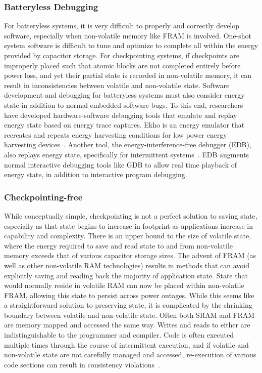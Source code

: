 \subsubsection{Batteryless Debugging}
For batteryless systems, it
is very difficult to properly and correctly develop software, especially when non-volatile memory like FRAM is involved.
One-shot system software is difficult to tune and optimize to complete all within the energy provided by capacitor storage.
For checkpointing systems, if checkpoints are improperly placed such that atomic blocks are not completed entirely before power loss, and yet their partial state is recorded in non-volatile memory,
it can result in inconsistencies between volatile and non-volatile state.
Software development and debugging for batteryless systems must also consider energy state in addition to normal embedded software bugs.
To this end, researchers have developed hardware-software debugging tools that emulate and replay energy state based on energy trace captures.
Ekho is an energy emulator that recreates and repeats energy harvesting conditions for low power energy harvesting devices~\cite{hester2014ekho}.
Another tool, the energy-interference-free debugger (EDB), also replays energy state, specifically for intermittent systems~\cite{colin2016energy}.
EDB augments normal interactive debugging tools like GDB to allow real time playback of energy state, in addition to interactive program debugging.

\subsubsection{Checkpointing-free}
While conceptually simple, checkpointing is not a perfect solution to saving state, especially as that state begins to increase in footprint as applications increase in capability and complexity. There is an upper bound to the size of volatile state, where the energy required to save and read state to and from non-volatile memory exceeds that of various capacitor storage sizes.
The advent of FRAM (as well as other non-volatile RAM technologies) results in methods that can avoid explicitly saving and reading back the majority of application state. State that would normally reside in volatile RAM can now be placed within non-volatile FRAM, allowing this state to persist across power outages.
While this seems like a straightforward solution to preserving state, it is complicated by the shrinking
boundary between volatile and non-volatile state. Often both SRAM and FRAM are memory mapped and accessed the same way. Writes and reads to either are indistinguishable to the programmer and compiler.
Code is often executed multiple times through the course of intermittent execution, and if volatile and non-volatile state are not carefully managed and accessed, re-execution of various code sections can result in consistency violations~\cite{maeng2017alpaca}.

